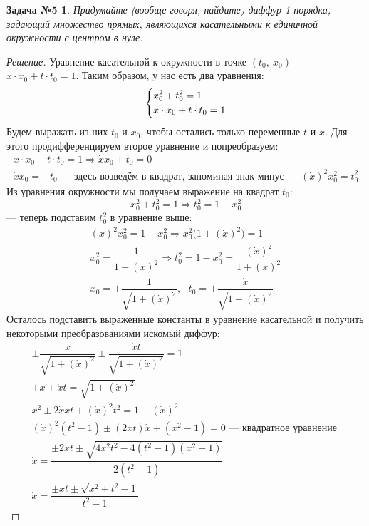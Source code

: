 \documentclass[a4paper,12pt]{article}
\newtheorem*{task5}{Задача №5}
\newcommand{\dx}{\dot{x}}
\newcommand{\ds}{\displaystyle}
\begin{document}
\begin{task5}
	Придумайте (вообще говоря, найдите) диффур 1 порядка, задающий множество прямых, являющихся касательными к единичной окружности с центром в нуле.
\end{task5}
\begin{proof}[Решение]
	Уравнение касательной к окружности в точке $(t_0,\ x_0)$ --- $x \cdot x_0 + t \cdot t_0 = 1$. Таким образом, у нас есть два уравнения:
	\[\left\{\begin{gathered}
		x_0^2 + t_0^2 = 1\hfill\\
		x \cdot x_0 + t \cdot t_0 = 1\hfill
	\end{gathered}\right.\]
	Будем выражать из них $t_0$ и $x_0$, чтобы остались только переменные $t$ и $x$. Для этого продифференцируем второе уравнение и попреобразуем:
	\begin{gather*}
		x \cdot x_0 + t \cdot t_0 = 1 \Longrightarrow \dx x_0 + t_0 = 0\\
		\dx x_0 = -t_0 \text{ --- здесь возведём в квадрат, запоминая знак минус --- } (\dx)^2x_0^2 = t_0^2
	\end{gather*}
	Из уравнения окружности мы  получаем выражение на квадрат $t_0$:
	\[x_0^2 + t_0^2 = 1 \Longrightarrow t_0^2 = 1 - x_0^2\] --- теперь подставим $t_0^2$ в уравнение выше:
	\begin{gather*}
		(\dx)^2x_0^2 = 1 - x_0^2 \Longrightarrow x_0^2\big(1 + (\dx)^2\big) = 1\\
		x_0^2 = \dfrac{1}{1 + (\dx)^2} \Longrightarrow t_0^2 = 1 - x_0^2 = \dfrac{(\dx)^2}{1 + (\dx)^2}\\
		x_0 = \ds\pm\dfrac{1}{\sqrt{1 + (\dx)^2}},\ \ \ t_0 = \ds\pm\dfrac{\dx}{\sqrt{1 + (\dx)^2}}
	\end{gather*}
	Осталось подставить выраженные константы в уравнение касательной и получить некоторыми преобразованиями искомый диффур:
	\begin{gather*}
		\ds\pm\dfrac{x}{\sqrt{1 + (\dx)^2}} \ds\pm\dfrac{\dx t}{\sqrt{1 + (\dx)^2}} = 1\\
		\ds\pm x \ds\pm \dx t = \sqrt{1 + (\dx)^2}\\
		x^2 \ds\pm 2\dx x t + (\dx)^2t^2 = 1 + (\dx)^2\\
		(\dx)^2(t^2 - 1) \ds\pm (2xt)\dx + (x^2 - 1) = 0 \text{ --- квадратное уравнение }\\
		\dx = \dfrac{\pm 2xt \pm \sqrt{4x^2t^2 - 4(t^2 - 1)(x^2 - 1)}}{2(t^2 - 1)}\\
		\dx = \dfrac{\pm xt \pm \sqrt{x^2 + t^2 - 1}}{t^2 - 1}
	\end{gather*}
\end{proof}
\end{document}
